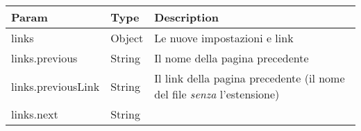 \begin{longtable}[]{@{}lll@{}}
\toprule
\begin{minipage}[b]{0.30\columnwidth}\raggedright
Param\strut
\end{minipage} & \begin{minipage}[b]{0.30\columnwidth}\raggedright
Type\strut
\end{minipage} & \begin{minipage}[b]{0.30\columnwidth}\raggedright
Description\strut
\end{minipage}\tabularnewline
\midrule
\endhead
\begin{minipage}[t]{0.30\columnwidth}\raggedright
links\strut
\end{minipage} & \begin{minipage}[t]{0.30\columnwidth}\raggedright
Object\strut
\end{minipage} & \begin{minipage}[t]{0.30\columnwidth}\raggedright
Le nuove impostazioni e link\strut
\end{minipage}\tabularnewline
\begin{minipage}[t]{0.30\columnwidth}\raggedright
links.previous\strut
\end{minipage} & \begin{minipage}[t]{0.30\columnwidth}\raggedright
String\strut
\end{minipage} & \begin{minipage}[t]{0.30\columnwidth}\raggedright
Il nome della pagina precedente\strut
\end{minipage}\tabularnewline
\begin{minipage}[t]{0.30\columnwidth}\raggedright
links.previousLink\strut
\end{minipage} & \begin{minipage}[t]{0.30\columnwidth}\raggedright
String\strut
\end{minipage} & \begin{minipage}[t]{0.30\columnwidth}\raggedright
Il link della pagina precedente (il nome del file \emph{senza}
l'estensione)\strut
\end{minipage}\tabularnewline
\begin{minipage}[t]{0.30\columnwidth}\raggedright
links.next\strut
\end{minipage} & \begin{minipage}[t]{0.30\columnwidth}\raggedright
String\strut
\end{minipage} & \begin{minipage}[t]{0.30\columnwidth}\raggedright

\end{minipage}
\end{longtable}
